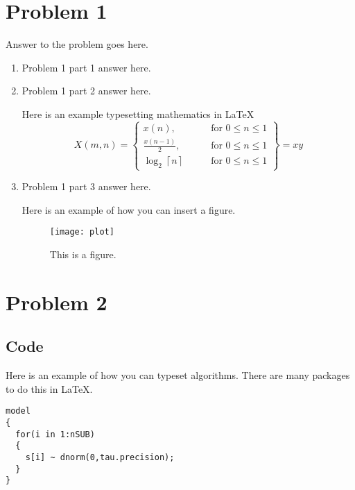 \documentclass[12pt,letterpaper]{article}
\begin{document}
\section*{Problem 1}

Answer to the problem goes here.

\begin{enumerate}
  \item
   Problem 1 part 1 answer here.
  \item
    Problem 1 part 2 answer here.

    Here is an example typesetting mathematics in \LaTeX
\begin{equation*}
    X(m,n) = \left\{\begin{array}{lr}
        x(n), & \text{for } 0\leq n\leq 1\\
        \frac{x(n-1)}{2}, & \text{for } 0\leq n\leq 1\\
        \log_2 \left\lceil n \right\rceil \qquad & \text{for } 0\leq n\leq 1
        \end{array}\right\} = xy
\end{equation*}



     
  \item Problem 1 part 3 answer here.

    Here is an example of how you can insert a figure.
    \begin{figure}[!h]
    \centering
    \texttt{[image: plot]}
    \caption{This is a figure.}
    \end{figure}
\end{enumerate}


\section*{Problem 2}

\newpage
\begin{appendix}
\section{Code}
    Here is an example of how you can typeset algorithms.
    There are many packages to do this in \LaTeX.
  
     \begin{lstlisting}[style = R]
model
{
  for(i in 1:nSUB)
  {
    s[i] ~ dnorm(0,tau.precision);
  }
}
    \end{lstlisting}


\end{appendix}
\end{document}
